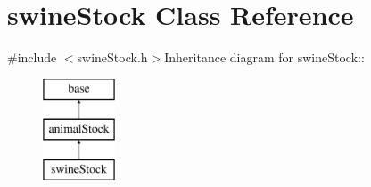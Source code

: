 \hypertarget{classswine_stock}{
\section{swineStock Class Reference}
\label{classswine_stock}
}


{\ttfamily \#include $<$swineStock.h$>$}Inheritance diagram for swineStock::\begin{figure}[H]
\begin{center}
\leavevmode
\includegraphics[height=3cm]{classswine_stock}
\end{center}
\end{figure}
